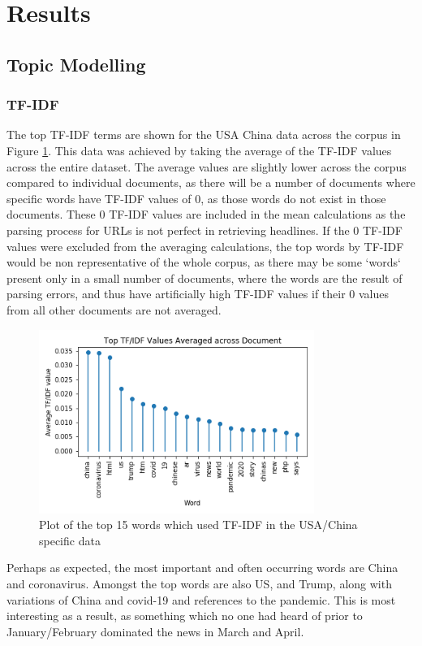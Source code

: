 \section{Results}
\label{results}
\subsection{Topic Modelling}
\subsubsection{TF-IDF}
The top TF-IDF terms are shown for the USA China data across the corpus in Figure \ref{fig:tfidfusachina}. This data was achieved by taking the average of the TF-IDF values across the entire dataset. The average values are slightly lower across the corpus compared to individual documents, as there will be a number of documents where specific words have TF-IDF values of 0, as those words do not exist in those documents. These 0 TF-IDF values are included in the mean calculations as the parsing process for URLs is not perfect in retrieving headlines. If the 0 TF-IDF values were excluded from the averaging calculations, the top words by TF-IDF would be non representative of the whole corpus, as there may be some `words` present only in a small number of documents, where the words are the result of parsing errors, and thus have artificially high TF-IDF values if their 0 values from all other documents are not averaged.

\begin{figure}[H]
	\centering
	\includegraphics[width=0.8\textwidth]{Images/usa_stem_tfidf.png}
	\caption{Plot of the top 15 words which used TF-IDF in the USA/China specific data}
	\label{fig:tfidfusachina}
\end{figure}

Perhaps as expected, the most important and often occurring words are China and coronavirus.  Amongst the top words are also US, and Trump, along with variations of China and covid-19 and references to the pandemic. This is most interesting as a result, as something which no one had heard of prior to January/February dominated the news in March and April.

